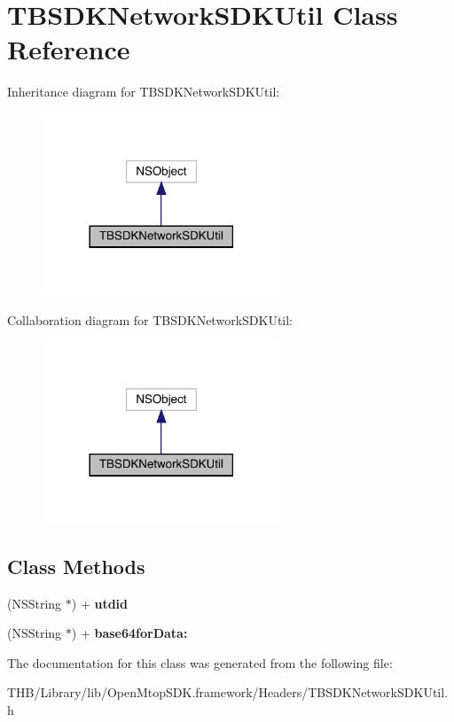 \hypertarget{interface_t_b_s_d_k_network_s_d_k_util}{}\section{T\+B\+S\+D\+K\+Network\+S\+D\+K\+Util Class Reference}
\label{interface_t_b_s_d_k_network_s_d_k_util}


Inheritance diagram for T\+B\+S\+D\+K\+Network\+S\+D\+K\+Util\+:\nopagebreak
\begin{figure}[H]
\begin{center}
\leavevmode
\includegraphics[width=201pt]{interface_t_b_s_d_k_network_s_d_k_util__inherit__graph}
\end{center}
\end{figure}


Collaboration diagram for T\+B\+S\+D\+K\+Network\+S\+D\+K\+Util\+:\nopagebreak
\begin{figure}[H]
\begin{center}
\leavevmode
\includegraphics[width=201pt]{interface_t_b_s_d_k_network_s_d_k_util__coll__graph}
\end{center}
\end{figure}
\subsection*{Class Methods}
\begin{DoxyCompactItemize}
\item 
\mbox{\label{interface_t_b_s_d_k_network_s_d_k_util_a8b9b8eb4d606c22a38dacd141425e6ae}} 
(N\+S\+String $\ast$) + {\bfseries utdid}
\item 
\mbox{\label{interface_t_b_s_d_k_network_s_d_k_util_af1db4b1f14e64dc0f43c6917836aa89b}} 
(N\+S\+String $\ast$) + {\bfseries base64for\+Data\+:}
\end{DoxyCompactItemize}


The documentation for this class was generated from the following file\+:\begin{DoxyCompactItemize}
\item 
T\+H\+B/\+Library/lib/\+Open\+Mtop\+S\+D\+K.\+framework/\+Headers/T\+B\+S\+D\+K\+Network\+S\+D\+K\+Util.\+h\end{DoxyCompactItemize}
